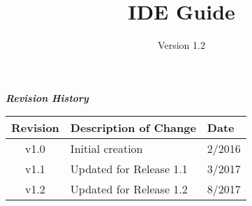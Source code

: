 \iffalse
This file is protected by Copyright. Please refer to the COPYRIGHT file
distributed with this source distribution.

This file is part of OpenCPI <http://www.opencpi.org>

OpenCPI is free software: you can redistribute it and/or modify it under the
terms of the GNU Lesser General Public License as published by the Free Software
Foundation, either version 3 of the License, or (at your option) any later
version.

OpenCPI is distributed in the hope that it will be useful, but WITHOUT ANY
WARRANTY; without even the implied warranty of MERCHANTABILITY or FITNESS FOR A
PARTICULAR PURPOSE. See the GNU Lesser General Public License for more details.

You should have received a copy of the GNU Lesser General Public License along
with this program. If not, see <http://www.gnu.org/licenses/>.
\fi
\def\docTitle{IDE Guide}
\def\docVersion{1.2}

\date{Version \docVersion} %
\title{\docTitle}
\lhead{\small{\docTitle}}

\maketitle
\thispagestyle{fancy}
\newpage

	\begin{center}
	\textit{\textbf{Revision History}}
		\begin{table}[H]
		\label{table:revisions} %
			\begin{tabularx}{\textwidth}{|c|X|l|}
			\hline
			\rowcolor{blue}
			\textbf{Revision} & \textbf{Description of Change} & \textbf{Date} \\
		    \hline
			v1.0 & Initial creation & 2/2016 \\
			\hline
			v1.1 & Updated for Release 1.1 & 3/2017 \\
			\hline
			v1.2 & Updated for Release 1.2 & 8/2017 \\
			\hline
			\end{tabularx}
		\end{table}
	\end{center}

